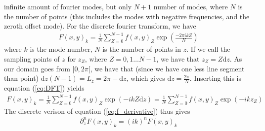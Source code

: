 \documentclass[12pt]{article}
\def\L{\left}
\def\R{\right}
\begin{document}
infinite amount of fourier modes, but only $N+1$ number of modes, where $N$ is
the number of points (this includes the modes with negative frequencies, and
the zeroth offset mode). For the discrete fourier transform, we have
%
\begin{align}
    F(x,y)_{k} = \frac{1}{N}\sum_{Z=0}^{N-1}f(x,y)_{Z}\exp\L(\frac{-2\pi i k
    Z}{N}\R)
    \label{eq:DFT}
\end{align}
%
where $k$ is the mode number, $N$ is the number of points in $z$. If we call
the sampling points of $z$ for $z_Z$, where $Z = 0, 1 \ldots N-1$, we have that
$z_Z = Z \text{d}z$. As our domain goes from $[0, 2\pi[$, we have that (since
        we have one less line segment than point) $\text{d}z (N-1) = L_z = 2\pi
        - \text{d}z$, which gives $\text{d}z = \frac{2\pi}{N}$. Inserting this
        is equation (\ref{eq:DFT}) yields
%
\begin{align*}
    F(x,y)_{k} = \frac{1}{N}\sum_{Z=0}^{N-1}f(x,y)_{Z}\exp\L( - i k
    Z\text{d}z\R) = \frac{1}{N}\sum_{Z=0}^{N-1}f(x,y)_{Z}\exp\L( - i k z_Z\R)
\end{align*}
%
The discrete verison of equation (\ref{eq:f_derivative}) thus gives
%
\begin{align*}
    \partial_z^n F(x,y)_k = (i k)^n F(x,y)_k
\end{align*}
%
\end{document}
